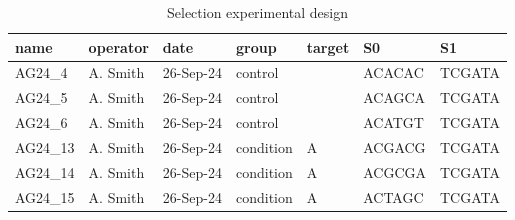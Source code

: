 \begin{table}[htbp]
\centering
\caption{Selection experimental design}
\label{tab:table4}
\begin{tabular}{lllllll}
\toprule
name & operator & date & group & target & S0 & S1 \\
\midrule
AG24\_4 & A. Smith & 26-Sep-24 & control &  & ACACAC & TCGATA \\
AG24\_5 & A. Smith & 26-Sep-24 & control &  & ACAGCA & TCGATA \\
AG24\_6 & A. Smith & 26-Sep-24 & control &  & ACATGT & TCGATA \\
AG24\_13 & A. Smith & 26-Sep-24 & condition & A & ACGACG & TCGATA \\
AG24\_14 & A. Smith & 26-Sep-24 & condition & A & ACGCGA & TCGATA \\
AG24\_15 & A. Smith & 26-Sep-24 & condition & A & ACTAGC & TCGATA \\
\bottomrule
\end{tabular}
\end{table}
